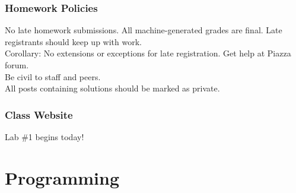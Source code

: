 \documentclass[11pt]{beamer}
\begin{document}
\begin{frame}
  \frametitle{Homework Policies}
  \Enlarge

  \begin{itemize}
    \myitem No late homework submissions. \pause
    \myitem All machine-generated grades are final. \pause
    \myitem Late registrants should keep up with work. \\ \textcolor{CS101GradBot}{\footnotesize\hspace{1em} Corollary:  No extensions or exceptions for late registration.} \pause
    \myitem Get help at Piazza forum. \\ \textcolor{CS101GradBot}{\footnotesize\hspace{1em} Be civil to staff and peers. \\ All posts containing solutions should be marked as private.}
  \end{itemize}
\end{frame}

\begin{frame}[plain,c]
  \frametitle{Class Website}
  \Enlarge

  \begin{center}
    \textcolor{CS101Base}{\Huge Lab \#1 begins today!}
  \end{center}
\end{frame}

\section{Programming}
\end{document}
